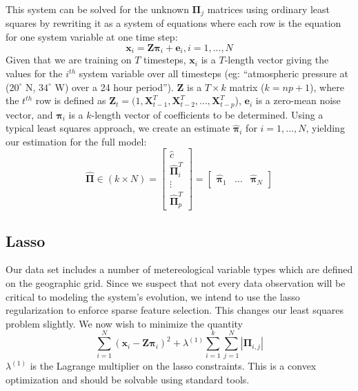\documentclass{article} %
\newcommand{\bs}{\boldsymbol}
\newcommand{\VARnumVars}{N}
\newcommand{\VARlag}{p}
\newcommand{\VARdata}{\bs{X}}
\newcommand{\VARmodel}{\bs{\Pi}}
\newcommand{\VARmodelrow}{\bs{\pi}}
\newcommand{\predicted}{\hat}
\newcommand{\lassoMult}{\lambda^{(1)}}
\begin{document}
This system can be solved for the unknown $\VARmodel_j$ matrices using ordinary least squares by rewriting it as a system of equations where each row is the equation for one system variable at one time step:
\begin{equation}
	\bs{x}_i = \bs{Z} \VARmodelrow_i+ \bs{e}_i,  i=1,...,\VARnumVars
\end{equation}
Given that we are training on $T$ timesteps, $\bs{x}_i$ is a $T$-length vector giving the values for the $i^{th}$ system variable over all timesteps (eg: ``atmospheric pressure at ($20^\circ$ N, $34^\circ$ W) over a 24 hour period''). $\bs{Z}$ is a $T \times k$ matrix ($k = np + 1$), where the $t^{th}$ row is defined as $\bs{Z}_t = (1, \VARdata_{t-1}^T, \VARdata_{t-2}^T,...,\VARdata_{t-p}^T$), $\bs{e}_i$ is a zero-mean noise vector, and $\VARmodelrow_i$ is a $k$-length vector of coefficients to be determined. Using a typical least squares approach, we create an estimate $\predicted{\VARmodelrow}_i$ for $i = 1,...,\VARnumVars$, yielding our estimation for the full model:
\begin{equation}
	\predicted{\VARmodel} \in (k \times N) 	=  \begin{bmatrix} \predicted{c} \\ \predicted{\VARmodel}_i^T \\ \vdots \\ \predicted{\VARmodel}_\VARlag^T \end{bmatrix} 
					=  \begin{bmatrix} \predicted{\VARmodelrow}_1 & \hdots & \predicted{\VARmodelrow}_\VARnumVars \end{bmatrix}
	\label{eq:model_matrix}
\end{equation}

\subsection{Lasso}
Our data set includes a number of metereological variable types which are defined on the geographic grid. Since we suspect that not every data observation will be critical to modeling the system's evolution, we intend to use the lasso regularization \cite{Tibshirani1996} to enforce sparse feature selection. This changes our least squares problem slightly. We now wish to minimize the quantity 
\begin{equation}
	\sum\limits_{i=1}^\VARnumVars (\bs{x}_i - \bs{Z} \VARmodelrow_i)^2  + \lassoMult \sum\limits_{i=1}^k \sum\limits_{j=1}^\VARnumVars | \VARmodel_{i,j} |
\end{equation}
$\lassoMult$ is the Lagrange multiplier on the lasso constraints. This is a convex optimization and should be solvable using standard tools.
\end{document}
